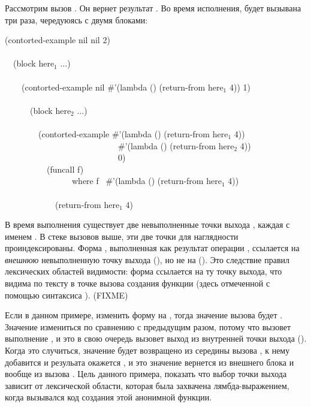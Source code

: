 Рассмотрим вызов . Он вернет результат
. Во время исполнения,  будет вызывана три раза,
чередуюясь с двумя блоками:

\begin{lisp}
(contorted-example nil nil 2) \\
 \\
~~(block here${}_1$ ...) \\
 \\
~~~~(contorted-example nil \#'(lambda () (return-from here${}_1$ 4)) 1) \\
 \\
~~~~~~(block here${}_2$ ...) \\
 \\
~~~~~~~~(contorted-example \#'(lambda () (return-from here${}_1$ 4)) \\
~~~~~~~~~~~~~~~~~~~~~~~~~~~\#'(lambda () (return-from here${}_2$ 4)) \\
~~~~~~~~~~~~~~~~~~~~~~~~~~~0) \\
~~~~~~~~~~(funcall f) \\
~~~~~~~~~~~~~~~~{\rm where} f \EV\ \#'(lambda () (return-from here${}_1$ 4)) \\
 \\
~~~~~~~~~~~~(return-from here${}_1$ 4)
\end{lisp}

В время выполнения  существует две невыполненные точки выхода
, каждая с именем . В стеке вызовов выше, эти две точки
для наглядности проиндексированы.
Форма , выполненная как результат операции ,
ссылается на \emph{внешнюю} невыполненную точку выхода (), но не
на ().
Это следствие правил лексических областей видимости: форма ссылается на ту точку
выхода, что видима по тексту в точке вызова создания функции
(здесь отмеченной с помощью синтаксиса ). (FIXME)

Если в данном примере, изменить форму  на ,
тогда значение вызова  будет . Значение
измениться по сравнению с предыдущим разом, потому что  вызовет
выполнение , и это в свою очередь вызовет выход
из внутренней точки выхода ().
Когда это случиться, значение  будет возвращено из середины вызова
, к нему добавится  и резульата окажется , и это
значение вернется из внешнего блока и вообще из вызова
. Цель данного примера, показать что выбор точки выхода
зависит от лексической области, которая была 
захвачена лямбда-выражением, когда вызывался код создания этой анонимной функции.

